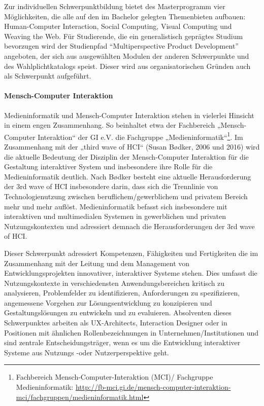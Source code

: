Zur individuellen Schwerpunktbildung bietet des Masterprogramm vier
Möglichkeiten, die alle auf den im Bachelor gelegten Themenbieten
aufbauen: Human-Computer Interaction, Social Computing, Visual Computing
und Weaving the Web. Für Studierende, die ein generalistisch geprägtes
Studium bevorzugen wird der Studienpfad ``Multiperspective Product
Development'' angeboten, der sich aus ausgewählten Modulen der anderen
Schwerpunkte und des Wahlplichtkatalogs speist. Dieser wird aus
organisatorischen Gründen auch als Schwerpunkt aufgeführt.

\paragraph{Mensch-Computer
Interaktion}\label{mensch-computer-interaktion}

Medieninformatik und Mensch-Computer Interaktion stehen in vielerlei
Hinsicht in einem engen Zusammenhang. So beinhaltet etwa der Fachbereich
„Mensch-Computer Interaktion`` der GI e.V. die Fachgruppe
„Medieninformatik``\footnote{Fachbereich Mensch-Computer-Interaktion
  (MCI)/ Fachgruppe Medieninformatik:
  \url{http://fb-mci.gi.de/mensch-computer-interaktion-mci/fachgruppen/medieninformatik.html}}.
Im Zusammenhang mit der „third wave of HCI`` (Susan Bødker, 2006 und
2016) wird die aktuelle Bedeutung der Disziplin der Mensch-Computer
Interaktion für die Gestaltung interaktiver System und insbesondere ihre
Rolle für die Medieninformatik deutlich. Nach Bødker besteht eine
aktuelle Herausforderung der 3rd wave of HCI insbesondere darin, dass
sich die Trennlinie von Technologienutzung zwischen
beruflichem/gewerblichem und privatem Bereich mehr und mehr auflöst.
Medieninformatik befasst sich insbesondere mit interaktiven und
multimedialen Systemen in gewerblichen und privaten Nutzungskontexten
und adressiert demnach die Herausforderungen der 3rd wave of HCI.

Dieser Schwerpunkt adressiert Kompetenzen, Fähigkeiten und Fertigkeiten
die im Zusammenhang mit der Leitung und dem Management von
Entwicklungsprojekten innovativer, interaktiver Systeme stehen. Dies
umfasst die Nutzungskontexte in verschiedensten Anwendungsbereichen
kritisch zu analysieren, Problemfelder zu identifizieren, Anforderungen
zu spezifizieren, angemessene Vorgehen zur Lösungsentwicklung zu
konzipieren und Gestaltungslösungen zu entwickeln und zu evaluieren.
Absolventen dieses Schwerpunktes arbeiten als UX-Architects, Interaction
Designer oder in Positionen mit ähnlichen Rollenbezeichnungen in
Unternehmen/Institutionen und sind zentrale Entscheidungsträger, wenn es
um die Entwicklung interaktiver Systeme aus Nutzungs -oder
Nutzerperspektive geht.

